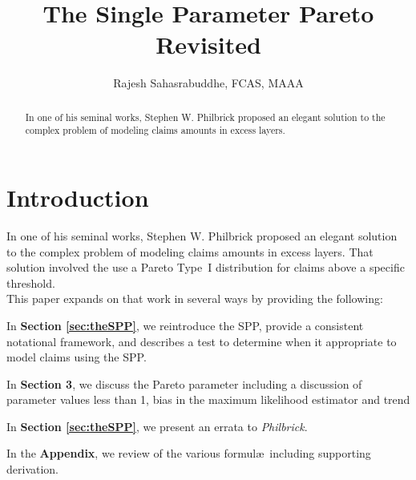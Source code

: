 \documentclass[]{article} %
\title{The Single Parameter Pareto Revisited}
\author{Rajesh Sahasrabuddhe, FCAS, MAAA}
\newcommand{\philbrick}{\textit{Philbrick}}
\begin{document}
\maketitle

\begin{abstract}
In one of his seminal works, Stephen W. Philbrick proposed an elegant solution to the complex problem of modeling claims amounts in excess layers. 

\end{abstract}

\section{Introduction}
In one of his seminal works, Stephen W. Philbrick\cite{Philbrick} proposed an elegant solution to the complex problem of modeling claims amounts in excess layers. That solution involved the use a Pareto Type~I distribution for claims above a specific threshold.\\

This paper expands on that work in several ways by providing the following:
\begin{description}
	\item In \textbf{Section \ref{sec:theSPP}}, we reintroduce the SPP, provide a consistent notational framework, and describes a test to determine when it appropriate to model claims using the SPP.
	
	\item In \textbf{Section 3}, we discuss the Pareto parameter including a discussion of parameter values less than 1, bias in the maximum likelihood estimator and trend
	
	\item In \textbf{Section \ref{sec:theSPP}}, we present an errata to \philbrick.
	
	\item In the \textbf{Appendix}, we review of the various formul\ae~including supporting derivation.
\end{description}

%

%

\end{document}
